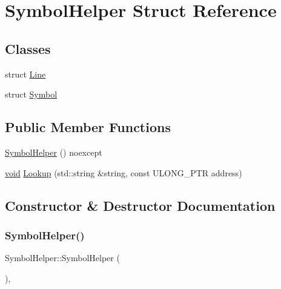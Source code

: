 \hypertarget{structSymbolHelper}{}\section{Symbol\+Helper Struct Reference}
\label{structSymbolHelper}
\subsection*{Classes}
\begin{DoxyCompactItemize}
\item 
struct \mbox{\hyperlink{structSymbolHelper_1_1Line}{Line}}
\item 
struct \mbox{\hyperlink{structSymbolHelper_1_1Symbol}{Symbol}}
\end{DoxyCompactItemize}
\subsection*{Public Member Functions}
\begin{DoxyCompactItemize}
\item 
\mbox{\hyperlink{structSymbolHelper_a95039a6bc86b4b3c6530e01bd33775f6}{Symbol\+Helper}} () noexcept
\item 
\mbox{\hyperlink{mlasi_8h_a88f941d423cb2a819b70a1358982b1a6}{void}} \mbox{\hyperlink{structSymbolHelper_a7835963964cfdd62b524a22175c63458}{Lookup}} (std\+::string \&string, const U\+L\+O\+N\+G\+\_\+\+P\+TR address)
\end{DoxyCompactItemize}


\subsection{Constructor \& Destructor Documentation}
\mbox{\label{structSymbolHelper_a95039a6bc86b4b3c6530e01bd33775f6}} 
\subsubsection{\texorpdfstring{Symbol\+Helper()}{SymbolHelper()}}
{\footnotesize\ttfamily Symbol\+Helper\+::\+Symbol\+Helper (\begin{DoxyParamCaption}{ }\end{DoxyParamCaption})\hspace{0.3cm}{\ttfamily [inline]}, {\ttfamily [noexcept]}}




